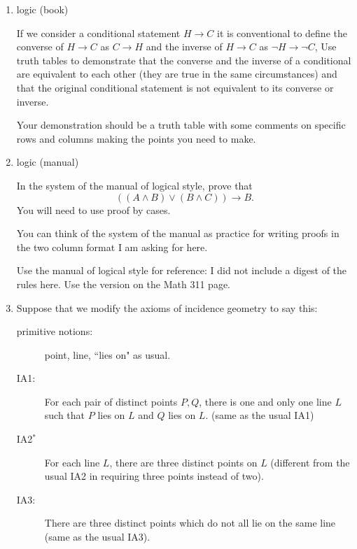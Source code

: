 \documentclass[12pt]{article}
\begin{document}
\begin{enumerate}
\item  logic (book)

If we consider a conditional statement $H \rightarrow C$ it is conventional to define the converse of $H \rightarrow C$ as $C \rightarrow H$ and
the inverse of $H \rightarrow C$ as $\neg H \rightarrow \neg C$,  Use truth tables to demonstrate that the converse and the inverse of a conditional are equivalent to each other (they are true in the same circumstances) and that the original conditional statement is not equivalent to its converse or inverse.

Your demonstration should be a truth table with some comments on specific rows and columns making the points you need to make.

\newpage

\item  logic (manual)

In the system of the manual of logical style, prove that $$((A \wedge B) \vee (B \wedge C)) \rightarrow B.$$  You will need to use proof by cases.

You can think of the system of the manual as practice for writing proofs in the two column format I am asking for here.

Use the manual of logical style for reference:  I did not include a digest of the rules here.  Use the version on the Math 311 page.

\newpage

\item  Suppose that we modify the axioms of incidence geometry to say this:

\begin{description}

\item[primitive notions:]  point, line, ``lies on" as usual.

\item[IA1:]  For each pair of distinct points $P, Q$, there is one and only one line $L$ such that $P$ lies on $L$ and $Q$ lies on $L$. (same as the usual IA1)

\item[IA2$^*$]  For each line $L$, there are three distinct points on $L$ (different from the usual IA2 in requiring three points instead of two).

\item[IA3:]  There are three distinct points which do not all lie on the same line (same as the usual IA3).


\end{description}
\end{enumerate}
\end{document}
